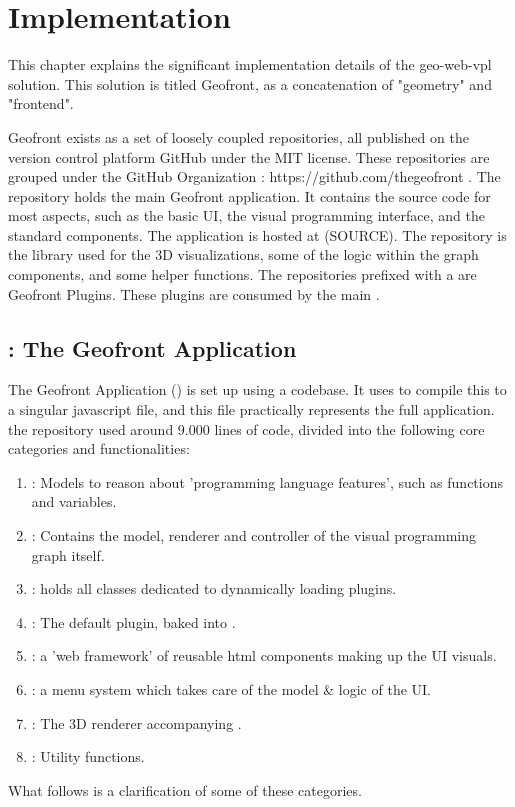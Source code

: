 \chapter{Implementation}%
\label{chap:implementation}

This chapter explains the significant implementation details of the geo-web-vpl solution.
This solution is titled Geofront, as a concatenation of "geometry" and "frontend".

Geofront exists as a set of loosely coupled repositories, all published on the version control platform GitHub under the MIT license. These repositories are grouped under the GitHub Organization  : https://github.com/thegeofront .
The  repository holds the main Geofront application. It contains the source code for most aspects, such as the basic UI, the visual programming interface, and the standard components. The application is hosted at (SOURCE).
The  repository is the library used for the 3D visualizations, some of the logic within the graph components, and some helper functions.
The repositories prefixed with a  are Geofront Plugins. These plugins are consumed by the main .


\section{\mySubRQOneTitle: The Geofront Application}
\label{sec:app}

The Geofront Application () is set up using a  codebase. It uses  to compile this to a singular javascript file, and this file practically represents the full application. 
the repository used around 9.000 lines of code, divided into the following core categories and functionalities:
\begin{enumerate}[I]
  \item {}: Models to reason about 'programming language features', such as functions and variables.
  \item {}: Contains the model, renderer and controller of the visual programming graph itself.  
  \item {}: holds all classes dedicated to dynamically loading plugins.
  \item {}: The default plugin, baked into \geofront{}.   
  \item {}: a 'web framework' of reusable html components making up the UI visuals.
  \item {}: a menu system which takes care of the model \& logic of the UI.
  \item {}: The 3D renderer accompanying \geofront{}.
  \item {}: Utility functions.   
\end{enumerate}
What follows is a clarification of some of these categories.

